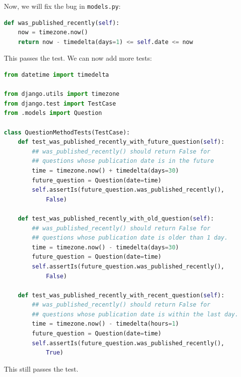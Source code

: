 \documentclass[a4paper, openany]{memoir}
\begin{document}
    Now, we will fix the bug in \texttt{models.py}:
\begin{lstlisting}[language=python]
def was_published_recently(self):
    now = timezone.now()
    return now - timedelta(days=1) <= self.date <= now
\end{lstlisting}
    This passes the test. We can now add more tests:
\begin{lstlisting}[language=python]
from datetime import timedelta

from django.utils import timezone
from django.test import TestCase
from .models import Question

class QuestionMethodTests(TestCase):
    def test_was_published_recently_with_future_question(self):
        ## was_published_recently() should return False for
        ## questions whose publication date is in the future
        time = timezone.now() + timedelta(days=30)
        future_question = Question(date=time)
        self.assertIs(future_question.was_published_recently(), 
            False)
    
    def test_was_published_recently_with_old_question(self):
        ## was_published_recently() should return False for
        ## questions whose publication date is older than 1 day.
        time = timezone.now() - timedelta(days=30)
        future_question = Question(date=time)
        self.assertIs(future_question.was_published_recently(), 
            False)
    
    def test_was_published_recently_with_recent_question(self):
        ## was_published_recently() should return False for
        ## questions whose publication date is within the last day.
        time = timezone.now() - timedelta(hours=1)
        future_question = Question(date=time)
        self.assertIs(future_question.was_published_recently(), 
            True)
\end{lstlisting}
    This still passes the test.
\end{document}
